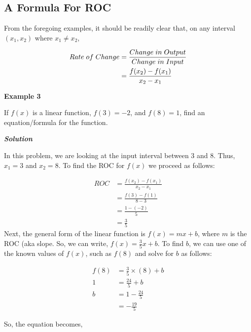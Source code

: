 \documentclass[
  letterpaper,
  DIV=11,
  numbers=noendperiod]{scrreprt}
\begin{document}
\hypertarget{a-formula-for-roc}{%
\subsection{A Formula For ROC}\label{a-formula-for-roc}}

From the foregoing examples, it should be readily clear that, on any
interval \((x_1,x_2)\) where \(x_1\neq x_2\),

\begin{align}
  Rate \hspace{0.04in}of\hspace{0.04in} Change                         
  &=\frac{Change\hspace{0.04in}in\hspace{0.04in}Output}{Change \hspace{0.04in}         
  in\hspace{0.04in}Input}\\
  &=\frac{f(x_2)-f(x_1)}{x_2 - x_1}
  \end{align}

\textbf{Example 3}

If \(f(x)\) is a linear function, \(f(3)=−2\), and \(f(8)=1\), find an
equation/formula for the function.

\textbf{\emph{Solution}}

In this problem, we are looking at the input interval between 3 and 8.
Thus, \(x_1=3\) and \(x_2=8\). To find the ROC for \(f(x)\) we proceed
as follows:

\begin{align}
ROC &= \frac{f(x_2)-f(x_1)}{x_2 - x_1}\\
&= \frac{f(3)-f(1)}{8 - 3}\\
&= \frac{1-(-2)}{5}\\
&=\frac{3}{5}
\end{align} Next, the general form of the linear function is
\(f(x)=mx+b\), where \(m\) is the ROC (aka slope. So, we can write,
\(f(x)=\frac{3}{5}x+b\). To find \(b\), we can use one of the known
values of \(f(x)\), such as \(f(8)\) and solve for \(b\) as follows:

\begin{align}
f(8)&=\frac{3}{5}\times (8)+b\\
1&=\frac{24}{5}+b\\
b&=1-\frac{24}{5}\\
&=-\frac{19}{5}
\end{align}

So, the equation becomes,
\end{document}
